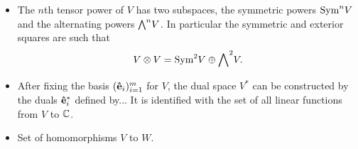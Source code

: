 \begin{itemize}
			\item The $n$th tensor power of $V$ has two subspaces, the symmetric powers $\text{Sym}^n V$ and the alternating powers ${\bigwedge}^n V$. In particular the symmetric and exterior squares are such that
			\begin{align*}
				V \otimes V = \text{Sym}^2 V \oplus {\bigwedge}^2 V.
			\end{align*}
			
			\item After fixing the basis $(\mathbf{\hat{e}}_i)_{i=1}^m$ for $V$, the dual space $V^*$ can be constructed by the duals $\mathbf{\hat{e}}_i^*$ defined by... It is identified with the set of all linear functions from $V$ to $\mathbb{C}$.
			
			\item Set of homomorphisms $V$ to $W$.
			
		\end{itemize} 
		
	

		
		
		